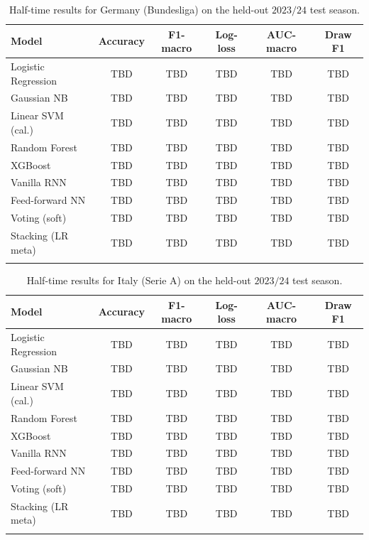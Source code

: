 \documentclass[pdflatex,sn-mathphys-num]{sn-jnl}
\theoremstyle{thmstyleone}
\theoremstyle{thmstyletwo}
\theoremstyle{thmstylethree}
\begin{document}
\begin{table}[h]
\caption{Half-time results for Germany (Bundesliga) on the held-out
$2023/24$ test season.}\label{tab:ht-ger}
\begin{tabular}{@{}lccccc@{}}
\toprule
Model               & Accuracy & F1-macro & Log-loss & AUC-macro & Draw F1 \\
\midrule
Logistic Regression & TBD & TBD & TBD & TBD & TBD \\
Gaussian NB         & TBD & TBD & TBD & TBD & TBD \\
Linear SVM (cal.)   & TBD & TBD & TBD & TBD & TBD \\
Random Forest       & TBD & TBD & TBD & TBD & TBD \\
XGBoost             & TBD & TBD & TBD & TBD & TBD \\
Vanilla RNN         & TBD & TBD & TBD & TBD & TBD \\
Feed-forward NN     & TBD & TBD & TBD & TBD & TBD \\
\midrule
Voting (soft)       & TBD & TBD & TBD & TBD & TBD \\
Stacking (LR meta)  & TBD & TBD & TBD & TBD & TBD \\
\botrule
\end{tabular}
\end{table}

\begin{table}[h]
\caption{Half-time results for Italy (Serie A) on the held-out
$2023/24$ test season.}\label{tab:ht-ita}
\begin{tabular}{@{}lccccc@{}}
\toprule
Model               & Accuracy & F1-macro & Log-loss & AUC-macro & Draw F1 \\
\midrule
Logistic Regression & TBD & TBD & TBD & TBD & TBD \\
Gaussian NB         & TBD & TBD & TBD & TBD & TBD \\
Linear SVM (cal.)   & TBD & TBD & TBD & TBD & TBD \\
Random Forest       & TBD & TBD & TBD & TBD & TBD \\
XGBoost             & TBD & TBD & TBD & TBD & TBD \\
Vanilla RNN         & TBD & TBD & TBD & TBD & TBD \\
Feed-forward NN     & TBD & TBD & TBD & TBD & TBD \\
\midrule
Voting (soft)       & TBD & TBD & TBD & TBD & TBD \\
Stacking (LR meta)  & TBD & TBD & TBD & TBD & TBD \\
\botrule
\end{tabular}
\end{table}
\end{document}
